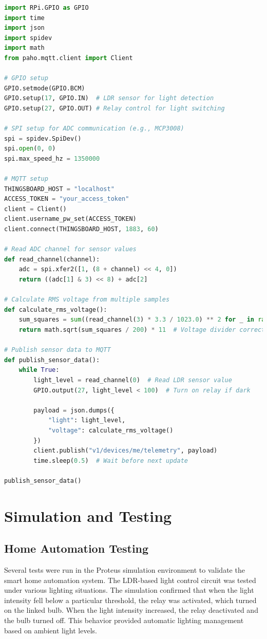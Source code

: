 \documentclass[a4paper,12pt]{report}
\begin{document}
\begin{lstlisting}[language=Python,caption={Raspberry Pi Code Collects Sensor Data and Sends it over using MQTT}]
import RPi.GPIO as GPIO
import time
import json
import spidev
import math
from paho.mqtt.client import Client

# GPIO setup
GPIO.setmode(GPIO.BCM)
GPIO.setup(17, GPIO.IN)  # LDR sensor for light detection
GPIO.setup(27, GPIO.OUT) # Relay control for light switching

# SPI setup for ADC communication (e.g., MCP3008)
spi = spidev.SpiDev()
spi.open(0, 0)
spi.max_speed_hz = 1350000

# MQTT setup
THINGSBOARD_HOST = "localhost"
ACCESS_TOKEN = "your_access_token"
client = Client()
client.username_pw_set(ACCESS_TOKEN)
client.connect(THINGSBOARD_HOST, 1883, 60)

# Read ADC channel for sensor values
def read_channel(channel):
    adc = spi.xfer2([1, (8 + channel) << 4, 0])
    return ((adc[1] & 3) << 8) + adc[2]

# Calculate RMS voltage from multiple samples
def calculate_rms_voltage():
    sum_squares = sum((read_channel(3) * 3.3 / 1023.0) ** 2 for _ in range(200))
    return math.sqrt(sum_squares / 200) * 11  # Voltage divider correction

# Publish sensor data to MQTT
def publish_sensor_data():
    while True:
        light_level = read_channel(0)  # Read LDR sensor value
        GPIO.output(27, light_level < 100)  # Turn on relay if dark
        
        payload = json.dumps({
            "light": light_level,
            "voltage": calculate_rms_voltage()
        })
        client.publish("v1/devices/me/telemetry", payload)
        time.sleep(0.5)  # Wait before next update

publish_sensor_data()
\end{lstlisting}

\section{Simulation and Testing}

\subsection{Home Automation Testing}
Several tests were run in the Proteus simulation environment to validate the smart home automation system.  The LDR-based light control circuit was tested under various lighting situations.  The simulation confirmed that when the light intensity fell below a particular threshold, the relay was activated, which turned on the linked bulb.  When the light intensity increased, the relay deactivated and the bulb turned off.  This behavior provided automatic lighting management based on ambient light levels.
\end{document}
